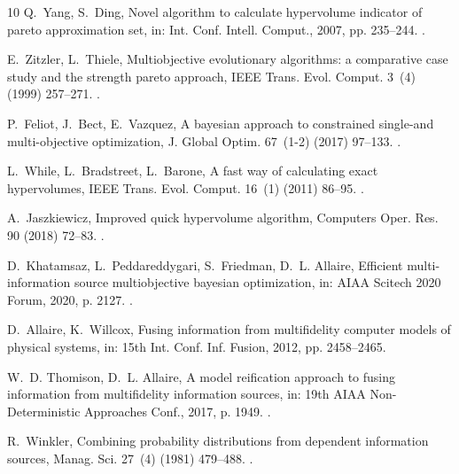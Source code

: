 \documentclass[preprint,12pt,times]{elsarticle}  %
\providecommand{\JournalTitle}[1]{#1}
\begin{document}
\begin{thebibliography}{10}
Q.~Yang, S.~Ding, Novel algorithm to calculate hypervolume indicator of pareto
  approximation set, in: Int. Conf. Intell. Comput., 2007, pp. 235--244.
\newblock \href {http://dx.doi.org/{10.1007/978-3-540-74282-1_27}}
  {}.

E.~Zitzler, L.~Thiele, Multiobjective evolutionary algorithms: a comparative
  case study and the strength pareto approach, {\JournalTitle{IEEE Trans. Evol.
  Comput.}} 3~(4) (1999) 257--271.
\newblock \href {http://dx.doi.org/10.1109/4235.797969}
  {}.

P.~Feliot, J.~Bect, E.~Vazquez, A bayesian approach to constrained single-and
  multi-objective optimization, {\JournalTitle{J. Global Optim.}} 67~(1-2)
  (2017) 97--133.
\newblock \href {http://dx.doi.org/10.1007/s10898-016-0427-3}
  {}.

L.~While, L.~Bradstreet, L.~Barone, A fast way of calculating exact
  hypervolumes, {\JournalTitle{IEEE Trans. Evol. Comput.}} 16~(1) (2011)
  86--95.
\newblock \href {http://dx.doi.org/10.1109/TEVC.2010.2077298}
  {}.

A.~Jaszkiewicz, Improved quick hypervolume algorithm, {\JournalTitle{Computers
  Oper. Res.}} 90 (2018) 72--83.
\newblock \href {http://dx.doi.org/10.1016/j.cor.2017.09.016}
  {}.

D.~Khatamsaz, L.~Peddareddygari, S.~Friedman, D.~L. Allaire, Efficient
  multi-information source multiobjective bayesian optimization, in: AIAA
  Scitech 2020 Forum, 2020, p. 2127.
\newblock \href {http://dx.doi.org/10.2514/6.2020-2127}
  {}.

D.~Allaire, K.~Willcox, Fusing information from multifidelity computer models
  of physical systems, in: 15th Int. Conf. Inf. Fusion, 2012, pp. 2458--2465.

W.~D. Thomison, D.~L. Allaire, A model reification approach to fusing
  information from multifidelity information sources, in: 19th AIAA
  Non-Deterministic Approaches Conf., 2017, p. 1949.
\newblock \href {http://dx.doi.org/10.2514/6.2017-1949}
  {}.

R.~Winkler, Combining probability distributions from dependent information
  sources, {\JournalTitle{Manag. Sci.}} 27~(4) (1981) 479--488.
\newblock \href {http://dx.doi.org/10.1287/mnsc.27.4.479}
  {}.


\end{thebibliography}
\end{document}
